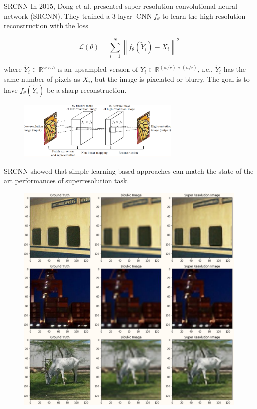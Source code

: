 \begin{frame}[allowframebreaks]

\begin{mydefinitionblock}{8.6}{SRCNN}
    In 2015, Dong et al. presented super-resolution convolutional neural network (SRCNN). They trained a 3-layer $\operatorname{CNN} f_{\theta}$ to learn the high-resolution reconstruction with the loss

    $$
    \mathcal{L}(\theta)=\sum_{i=1}^{N}\left\|f_{\theta}\left(\tilde{Y}_{i}\right)-X_{i}\right\|^{2}
    $$

    where $\tilde{Y}_{i} \in \mathbb{R}^{w \times h}$ is an upsampled version of $Y_{i} \in \mathbb{R}^{(w / r) \times(h / r)}$, i.e., $\tilde{Y}_{i}$ has the same number of pixels as $X_{i}$, but the image is pixelated or blurry. The goal is to have $f_{\theta}\left(\tilde{Y}_{i}\right)$ be a sharp reconstruction.

    \begin{figure}[H]
        \centering
        \includegraphics[width=0.7\textwidth]{.././assets/8.3.png}
    \end{figure}

    \par\noindent\textcolor{gray}{\hdashrule{\textwidth}{0.4pt}{1pt 2pt}}

    SRCNN showed that simple learning based approaches can match the state-of the art performances of superresolution task.

    \begin{figure}[H]
        \centering
        \includegraphics[width=1.0\textwidth]{.././assets/8.4.png}
    \end{figure}


\end{mydefinitionblock}
\end{frame}
